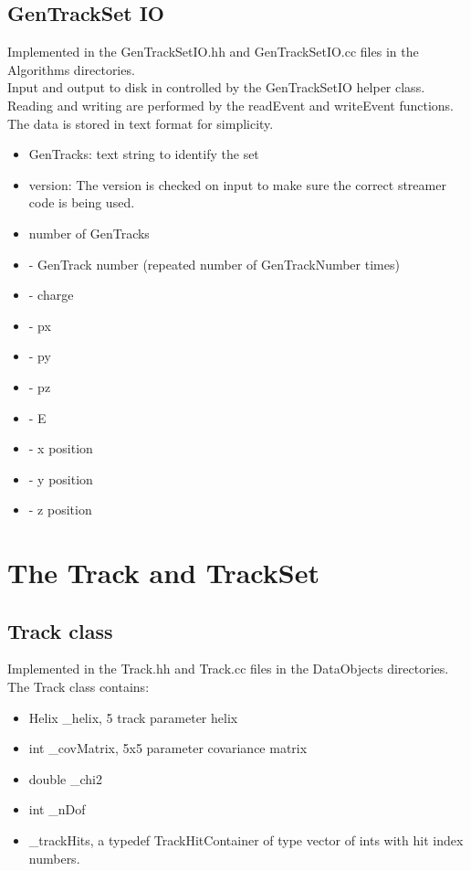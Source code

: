 \documentclass[aps,prd,superscriptaddress,floatfix]{revtex4}
\begin{document}
\subsection{GenTrackSet IO}
Implemented in the GenTrackSetIO.hh and GenTrackSetIO.cc files in the Algorithms directories.
\\

Input and output to disk in controlled by the GenTrackSetIO helper class.  Reading and writing
are performed by the readEvent and writeEvent functions.
\\

The data is stored in text format for simplicity.

\begin{itemize}
\item  GenTracks: text string to identify the set
\item version: The version is checked on input to make sure the correct streamer code is being used.
\item number of GenTracks
\item - GenTrack number (repeated number of GenTrackNumber times)
\item - charge
\item - px
\item - py
\item - pz
\item - E
\item - x position
\item - y position
\item - z position
\end{itemize}

\section{The Track and TrackSet}
\subsection{Track class}
Implemented in the Track.hh and Track.cc files in the DataObjects directories.
\\

The Track class contains:
\begin{itemize}
\item Helix \_helix, 5 track parameter helix
\item int \_covMatrix, 5x5 parameter covariance matrix
\item double \_chi2
\item int \_nDof
\item \_trackHits, a typedef TrackHitContainer of type vector of ints with hit index numbers.
\end{itemize}
\end{document}
